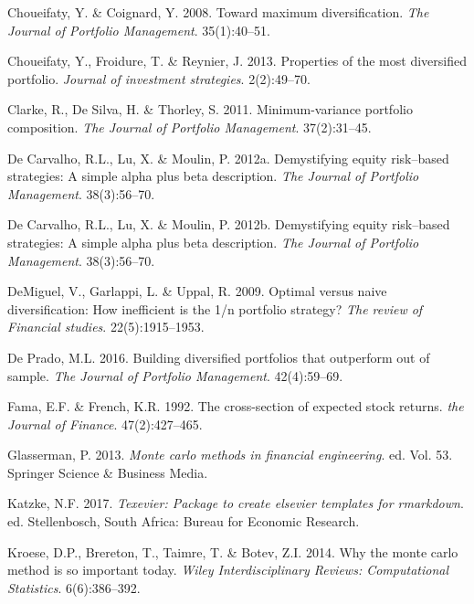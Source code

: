 \documentclass[11pt,preprint, authoryear]{elsarticle}
\numberwithin{equation}{section}
\numberwithin{figure}{section}
\numberwithin{table}{section}
\begin{document}
\leavevmode\hypertarget{ref-choueifaty2008}{}%
Choueifaty, Y. \& Coignard, Y. 2008. Toward maximum diversification.
\emph{The Journal of Portfolio Management}. 35(1):40--51.

\leavevmode\hypertarget{ref-choueifaty2013}{}%
Choueifaty, Y., Froidure, T. \& Reynier, J. 2013. Properties of the most
diversified portfolio. \emph{Journal of investment strategies}.
2(2):49--70.

\leavevmode\hypertarget{ref-clarke2011}{}%
Clarke, R., De Silva, H. \& Thorley, S. 2011. Minimum-variance portfolio
composition. \emph{The Journal of Portfolio Management}. 37(2):31--45.

\leavevmode\hypertarget{ref-leote}{}%
De Carvalho, R.L., Lu, X. \& Moulin, P. 2012a. Demystifying equity
risk--based strategies: A simple alpha plus beta description. \emph{The
Journal of Portfolio Management}. 38(3):56--70.

\leavevmode\hypertarget{ref-rawl2012}{}%
De Carvalho, R.L., Lu, X. \& Moulin, P. 2012b. Demystifying equity
risk--based strategies: A simple alpha plus beta description. \emph{The
Journal of Portfolio Management}. 38(3):56--70.

\leavevmode\hypertarget{ref-demiguel2009}{}%
DeMiguel, V., Garlappi, L. \& Uppal, R. 2009. Optimal versus naive
diversification: How inefficient is the 1/n portfolio strategy?
\emph{The review of Financial studies}. 22(5):1915--1953.

\leavevmode\hypertarget{ref-lopez}{}%
De Prado, M.L. 2016. Building diversified portfolios that outperform out
of sample. \emph{The Journal of Portfolio Management}. 42(4):59--69.

\leavevmode\hypertarget{ref-fama1992}{}%
Fama, E.F. \& French, K.R. 1992. The cross-section of expected stock
returns. \emph{the Journal of Finance}. 47(2):427--465.

\leavevmode\hypertarget{ref-glasserman2013}{}%
Glasserman, P. 2013. \emph{Monte carlo methods in financial
engineering}. ed. Vol. 53. Springer Science \& Business Media.

\leavevmode\hypertarget{ref-Texevier}{}%
Katzke, N.F. 2017. \emph{Texevier: Package to create elsevier templates
for rmarkdown}. ed. Stellenbosch, South Africa: Bureau for Economic
Research.

\leavevmode\hypertarget{ref-kroese2014}{}%
Kroese, D.P., Brereton, T., Taimre, T. \& Botev, Z.I. 2014. Why the
monte carlo method is so important today. \emph{Wiley Interdisciplinary
Reviews: Computational Statistics}. 6(6):386--392.
\end{document}
